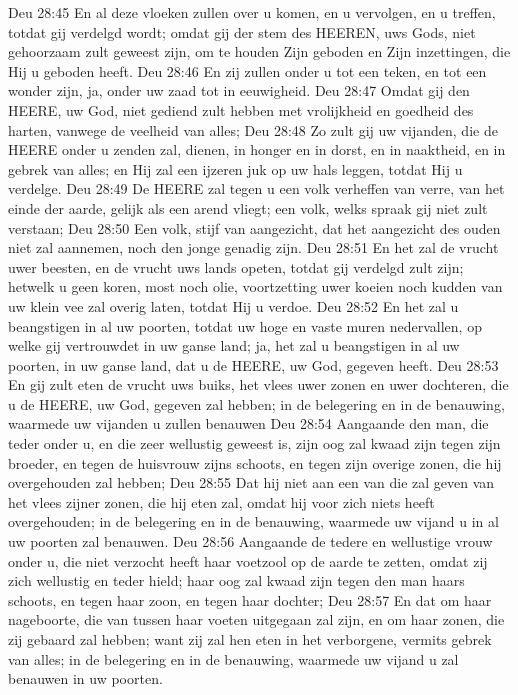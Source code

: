 Deu 28:45  En al deze vloeken zullen over u komen, en u vervolgen, en u treffen, totdat gij verdelgd wordt; omdat gij der stem des HEEREN, uws Gods, niet gehoorzaam zult geweest zijn, om te houden Zijn geboden en Zijn inzettingen, die Hij u geboden heeft.
Deu 28:46  En zij zullen onder u tot een teken, en tot een wonder zijn, ja, onder uw zaad tot in eeuwigheid.
Deu 28:47  Omdat gij den HEERE, uw God, niet gediend zult hebben met vrolijkheid en goedheid des harten, vanwege de veelheid van alles;
Deu 28:48  Zo zult gij uw vijanden, die de HEERE onder u zenden zal, dienen, in honger en in dorst, en in naaktheid, en in gebrek van alles; en Hij zal een ijzeren juk op uw hals leggen, totdat Hij u verdelge.
Deu 28:49  De HEERE zal tegen u een volk verheffen van verre, van het einde der aarde, gelijk als een arend vliegt; een volk, welks spraak gij niet zult verstaan;
Deu 28:50  Een volk, stijf van aangezicht, dat het aangezicht des ouden niet zal aannemen, noch den jonge genadig zijn.
Deu 28:51  En het zal de vrucht uwer beesten, en de vrucht uws lands opeten, totdat gij verdelgd zult zijn; hetwelk u geen koren, most noch olie, voortzetting uwer koeien noch kudden van uw klein vee zal overig laten, totdat Hij u verdoe.
Deu 28:52  En het zal u beangstigen in al uw poorten, totdat uw hoge en vaste muren nedervallen, op welke gij vertrouwdet in uw ganse land; ja, het zal u beangstigen in al uw poorten, in uw ganse land, dat u de HEERE, uw God, gegeven heeft.
Deu 28:53  En gij zult eten de vrucht uws buiks, het vlees uwer zonen en uwer dochteren, die u de HEERE, uw God, gegeven zal hebben; in de belegering en in de benauwing, waarmede uw vijanden u zullen benauwen
Deu 28:54  Aangaande den man, die teder onder u, en die zeer wellustig geweest is, zijn oog zal kwaad zijn tegen zijn broeder, en tegen de huisvrouw zijns schoots, en tegen zijn overige zonen, die hij overgehouden zal hebben;
Deu 28:55  Dat hij niet aan een van die zal geven van het vlees zijner zonen, die hij eten zal, omdat hij voor zich niets heeft overgehouden; in de belegering en in de benauwing, waarmede uw vijand u in al uw poorten zal benauwen.
Deu 28:56  Aangaande de tedere en wellustige vrouw onder u, die niet verzocht heeft haar voetzool op de aarde te zetten, omdat zij zich wellustig en teder hield; haar oog zal kwaad zijn tegen den man haars schoots, en tegen haar zoon, en tegen haar dochter;
Deu 28:57  En dat om haar nageboorte, die van tussen haar voeten uitgegaan zal zijn, en om haar zonen, die zij gebaard zal hebben; want zij zal hen eten in het verborgene, vermits gebrek van alles; in de belegering en in de benauwing, waarmede uw vijand u zal benauwen in uw poorten.
